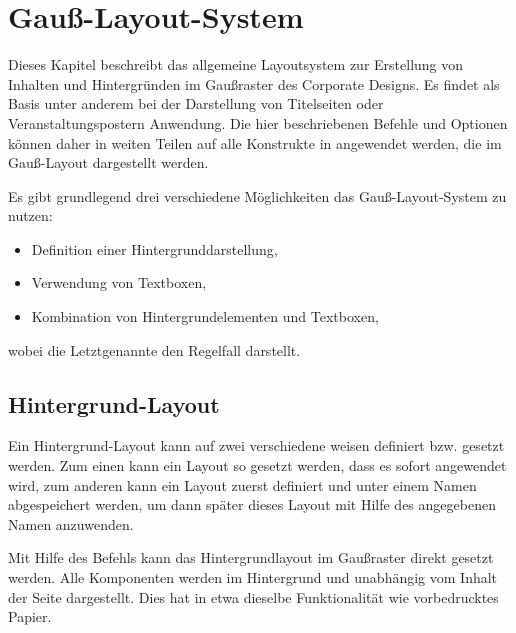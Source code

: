 \chapter{Gauß-Layout-System}\label{chap:gausspage}

Dieses Kapitel beschreibt das allgemeine Layoutsystem zur Erstellung von
Inhalten und Hintergründen im Gaußraster des Corporate Designs.
Es findet als Basis unter anderem bei der Darstellung von Titelseiten oder
Veranstaltungspostern Anwendung. Die hier beschriebenen Befehle und Optionen
können daher in weiten Teilen auf alle Konstrukte in \tubslatex angewendet
werden, die im Gauß-Layout dargestellt werden.

Es gibt grundlegend drei verschiedene Möglichkeiten das Gauß-Layout-System
zu nutzen:
\begin{itemize}
  \item Definition einer Hintergrunddarstellung,
  \item Verwendung von Textboxen,
  \item Kombination von Hintergrundelementen und Textboxen,
\end{itemize}
wobei die Letztgenannte den Regelfall darstellt.

\section{Hintergrund-Layout}\label{sec:gausspage:bglayout}

Ein Hintergrund-Layout kann auf zwei verschiedene weisen definiert bzw.
gesetzt werden.
Zum einen kann ein Layout so gesetzt werden, dass es sofort angewendet wird,
zum anderen kann ein Layout zuerst definiert und unter einem Namen
abgespeichert werden, um dann später dieses Layout mit Hilfe des angegebenen 
Namen anzuwenden.

\begin{Declaration}
\end{Declaration}

Mit Hilfe des Befehls  kann das Hintergrundlayout im Gaußraster direkt gesetzt werden.
Alle Komponenten werden im Hintergrund und unabhängig vom Inhalt der Seite
dargestellt.
Dies hat in etwa dieselbe Funktionalität wie vorbedrucktes Papier.

\begin{Declaration}
  \\
\end{Declaration}

